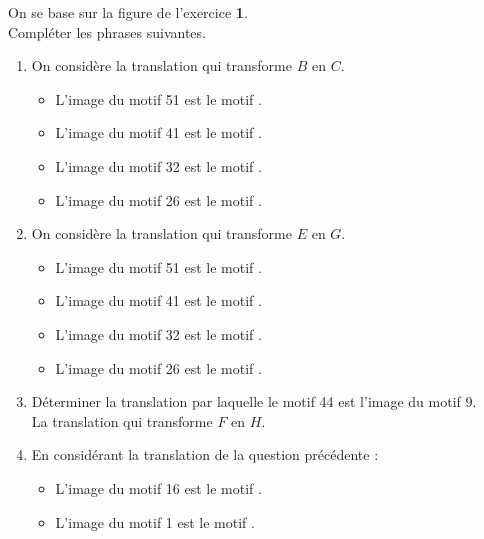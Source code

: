 \begin{corrige}
    On se base sur la figure de l'exercice {\bfseries 1}.\\ Compléter les phrases suivantes.\\
    \begin{changemargin}{0mm}{-5mm}
        \begin{enumerate}
            \item On considère la translation qui transforme $B$ en $C$.
            \begin{itemize}
                \item L'image du motif \num{51} est le motif {}.
                \item L'image du motif \num{41} est le motif {}.
                \item L'image du motif \num{32} est le motif {}.
                \item L'image du motif \num{26} est le motif {}.
            \end{itemize}
            \item On considère la translation qui transforme $E$ en $G$.
            \begin{itemize}
                \item L'image du motif \num{51} est le motif {}.
                \item L'image du motif \num{41} est le motif {}.
                \item L'image du motif \num{32} est le motif {}.
                \item L'image du motif \num{26} est le motif {}.
            \end{itemize}
            \item Déterminer la translation par laquelle le motif \num{44} est l'image du motif \num{9}.\\
            {\red La translation qui transforme $F$ en $H$.}
            \item En considérant la translation de la question précédente :
            \begin{itemize}
                \item L'image du motif \num{16} est le motif {}.
                \item L'image du motif \num{1} est le motif {}.
            \end{itemize}
        \end{enumerate}
    \end{changemargin}
\end{corrige}

